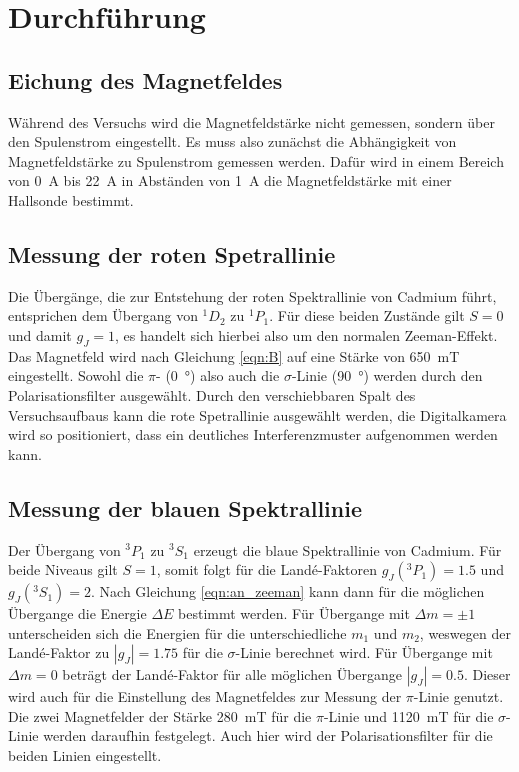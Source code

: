 \section{Durchführung}
\subsection{Eichung des Magnetfeldes}
Während des Versuchs wird die Magnetfeldstärke nicht gemessen, sondern über den Spulenstrom eingestellt.
Es muss also zunächst die Abhängigkeit von Magnetfeldstärke zu Spulenstrom gemessen werden.
Dafür wird in einem Bereich von \SI{0}{\ampere} bis \SI{22}{\ampere} in Abständen von \SI{1}{\ampere} die Magnetfeldstärke mit einer Hallsonde bestimmt.

\subsection{Messung der roten Spetrallinie}

Die Übergänge, die zur Entstehung der roten Spektrallinie von Cadmium führt, entsprichen dem Übergang von $^1D_2$ zu $^1P_1$.
Für diese beiden Zustände gilt $S=0$ und damit $g_J = 1$, es handelt sich hierbei also um den normalen Zeeman-Effekt.
Das Magnetfeld wird nach Gleichung \eqref{eqn:B} auf eine Stärke von \SI{650}{\milli\tesla} eingestellt.
Sowohl die $\pi$- (\SI{0}{\degree}) also auch die $\sigma$-Linie (\SI{90}{\degree}) werden durch den Polarisationsfilter ausgewählt.
Durch den verschiebbaren Spalt des Versuchsaufbaus kann die rote Spetrallinie ausgewählt werden, die Digitalkamera wird so positioniert, dass ein deutliches Interferenzmuster aufgenommen werden kann.


\subsection{Messung der blauen Spektrallinie}
Der Übergang von $^3P_1$ zu $^3S_1$ erzeugt die blaue Spektrallinie von Cadmium.
Für beide Niveaus gilt $S=1$, somit folgt für die Landé-Faktoren $g_J(^3P_1) = \num{1.5}$ und $g_J(^3S_1) = \num{2}$.
Nach Gleichung \ref{eqn:an_zeeman} kann dann für die möglichen Übergange die Energie $\Delta E$ bestimmt werden.
Für Übergange mit $\Delta m = \pm 1$ unterscheiden sich die Energien für die unterschiedliche $m_1$ und $m_2$, weswegen der Landé-Faktor zu $|g_J| = \num{1.75}$
für die $\sigma$-Linie berechnet wird.
Für Übergange mit $\Delta m = 0$ beträgt der Landé-Faktor für alle möglichen Übergange $|g_J| = \num{0.5}$.
Dieser wird auch für die Einstellung des Magnetfeldes zur Messung der $\pi$-Linie genutzt.
Die zwei Magnetfelder der Stärke \SI{280}{\milli\tesla} für die $\pi$-Linie und \SI{1120}{\milli\tesla} für die $\sigma$-Linie werden daraufhin festgelegt.
Auch hier wird der Polarisationsfilter für die beiden Linien eingestellt.
